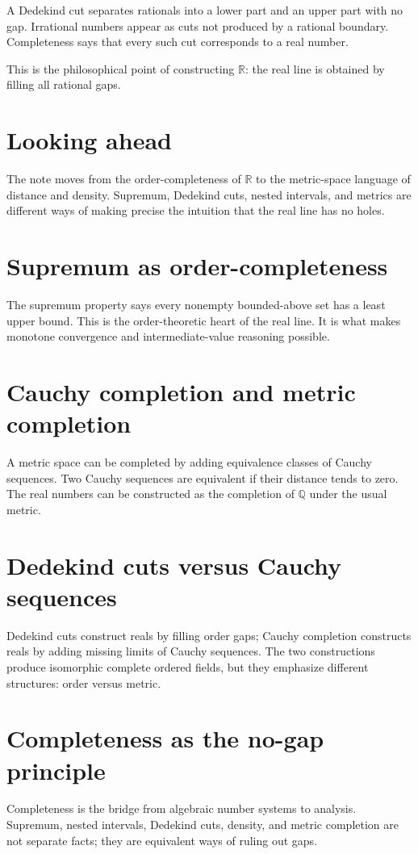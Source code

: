 A Dedekind cut separates rationals into a lower part and an upper part with no gap.  Irrational numbers appear as cuts not produced by a rational boundary.  Completeness says that every such cut corresponds to a real number.

This is the philosophical point of constructing \(\mathbb R\): the real line is obtained by filling all rational gaps.

\section{Looking ahead}

The note moves from the order-completeness of \(\mathbb R\) to the metric-space language of distance and density.  Supremum, Dedekind cuts, nested intervals, and metrics are different ways of making precise the intuition that the real line has no holes.

\section{Supremum as order-completeness}

The supremum property says every nonempty bounded-above set has a least upper bound.  This is the order-theoretic heart of the real line.  It is what makes monotone convergence and intermediate-value reasoning possible.

\section{Cauchy completion and metric completion}

A metric space can be completed by adding equivalence classes of Cauchy sequences.  Two Cauchy sequences are equivalent if their distance tends to zero.  The real numbers can be constructed as the completion of \(\mathbb Q\) under the usual metric.

\section{Dedekind cuts versus Cauchy sequences}

Dedekind cuts construct reals by filling order gaps; Cauchy completion constructs reals by adding missing limits of Cauchy sequences.  The two constructions produce isomorphic complete ordered fields, but they emphasize different structures: order versus metric.

\section{Completeness as the no-gap principle}

Completeness is the bridge from algebraic number systems to analysis.  Supremum, nested intervals, Dedekind cuts, density, and metric completion are not separate facts; they are equivalent ways of ruling out gaps.

